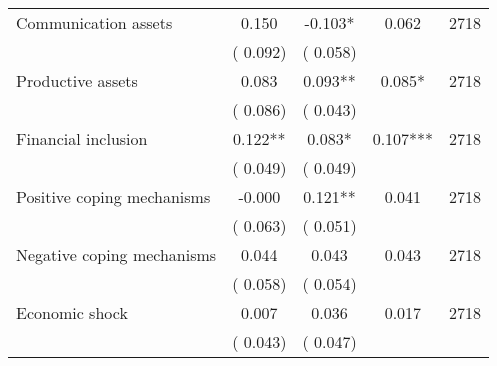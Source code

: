 \begin{tabular}{l*{4}{c}}
 Communication assets &              0.150 &        -0.103* &           0.062 & 2718                       \\  
                 &        (       0.092)                   &        (       0.058)                        &                                                             &                                                      \\      

 Productive assets &              0.083 &         0.093** &           0.085* & 2718                       \\  
                 &        (       0.086)                   &        (       0.043)                        &                                                             &                                                      \\      

 Financial inclusion &              0.122** &         0.083* &           0.107*** & 2718                       \\  
                 &        (       0.049)                   &        (       0.049)                        &                                                             &                                                      \\      

 Positive coping mechanisms &             -0.000 &         0.121** &           0.041 & 2718                       \\  
                 &        (       0.063)                   &        (       0.051)                        &                                                             &                                                      \\      

 Negative coping mechanisms &              0.044 &         0.043 &           0.043 & 2718                       \\  
                 &        (       0.058)                   &        (       0.054)                        &                                                             &                                                      \\      

 Economic shock &              0.007 &         0.036 &           0.017 & 2718                       \\  
                 &        (       0.043)                   &        (       0.047)                        &                                                             &                                                      \\      


\end{tabular}
